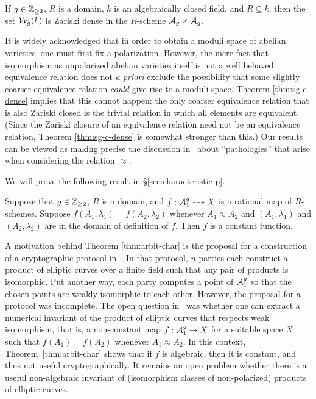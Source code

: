 \documentclass{amsart}
\begin{document}
\begin{theorem}\label{thm:sg-c-dense}
  If $g\in\mathbb{Z}_{\ge 2}$, $R$ is a domain, $k$ is an algebraically closed field, and $R \subseteq k$, then the set $\mathcal{W}_g(k)$ is Zariski dense in the $R$-scheme $\mathcal{A}_g \times \mathcal{A}_g$.
\end{theorem}

It is widely acknowledged that in order to obtain a moduli space of abelian varieties, one must first fix a polarization.  However, the mere fact that isomorphism as unpolarized abelian varieties itself is not a well behaved equivalence relation does not {\it a priori} exclude the possibility that some slightly coarser equivalence relation {\em could} give rise to a moduli space. Theorem \ref{thm:sg-c-dense} implies that this cannot happen: the only coarser equivalence relation that is also Zariski closed is the trivial relation in which all elements are equivalent.
(Since the Zariski closure of an equivalence relation need not be an equivalence relation, Theorem \ref{thm:sg-c-dense} is somewhat stronger than this.)
Our results can be viewed as making precise the discussion in~\cite[p. 97]{git} about  ``pathologies'' that arise when considering the relation $\approx$.

We will prove the following result in \S\ref{sec:characteristic-p}.
\begin{theorem}\label{thm:arbit-char}
  Suppose that $g\in\mathbb{Z}_{\ge 2}$, $R$ is a domain, and $f: \mathcal{A}_1^g \dashrightarrow X$ is a rational map of $R$-schemes. Suppose $f(A_1,\lambda_1) = f(A_2,\lambda_2)$ whenever $A_1 \approx A_2$ and $(A_1,\lambda_1)$ and $(A_2,\lambda_2)$ are in the domain of definition of $f$. Then $f$ is a constant function.
\end{theorem}

A motivation behind Theorem \ref{thm:arbit-char} is the proposal for a construction of a cryptographic protocol in~\cite{multiparty}. In that protocol, $n$ parties each construct a product of elliptic curves over a finite field such that any pair of products is isomorphic. Put another way, each party computes a point of $\mathcal{A}_1^g$ so that the chosen points are weakly isomorphic to each other. However, the proposal for a protocol was incomplete. The open question in~\cite{multiparty} was whether one can extract a numerical invariant of the product of elliptic curves that respects weak isomorphism, that is, a non-constant map $f: \mathcal{A}_1^g \to X$ for a suitable space $X$ such that $f(A_1) = f(A_2)$ whenever $A_1 \approx A_2$. In this context, Theorem~\ref{thm:arbit-char} shows that if $f$ is algebraic, then it is constant, and thus not useful cryptographically. It remains an open problem whether there is a useful non-algebraic invariant of (isomorphism classes of non-polarized) products of elliptic curves.
\end{document}
